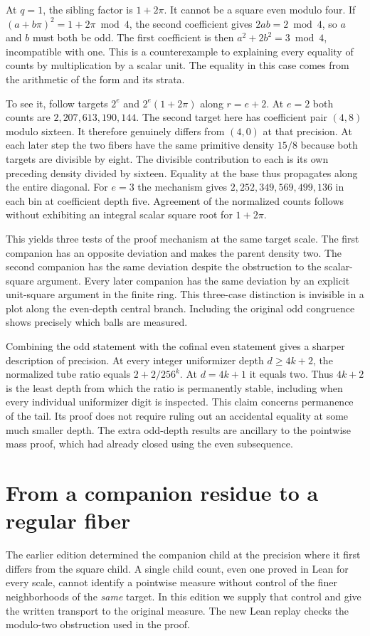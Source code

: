 \documentclass[12pt,letterpaper]{article}
\begin{document}
At $q=1$, the sibling factor is $1+2\pi$. It cannot be a square even modulo four. If $(a+b\pi)^2=1+2\pi\bmod4$, the second coefficient gives $2ab=2\bmod4$, so $a$ and $b$ must both be odd. The first coefficient is then $a^2+2b^2=3\bmod4$, incompatible with one. This is a counterexample to explaining every equality of counts by multiplication by a scalar unit. The equality in this case comes from the arithmetic of the form and its strata.

To see it, follow targets $2^e$ and $2^e(1+2\pi)$ along $r=e+2$. At $e=2$ both counts are $2{,}207{,}613{,}190{,}144$. The second target here has coefficient pair $(4,8)$ modulo sixteen. It therefore genuinely differs from $(4,0)$ at that precision. At each later step the two fibers have the same primitive density $15/8$ because both targets are divisible by eight. The divisible contribution to each is its own preceding density divided by sixteen. Equality at the base thus propagates along the entire diagonal. For $e=3$ the mechanism gives $2{,}252{,}349{,}569{,}499{,}136$ in each bin at coefficient depth five. Agreement of the normalized counts follows without exhibiting an integral scalar square root for $1+2\pi$.

This yields three tests of the proof mechanism at the same target scale. The first companion has an opposite deviation and makes the parent density two. The second companion has the same deviation despite the obstruction to the scalar-square argument. Every later companion has the same deviation by an explicit unit-square argument in the finite ring. This three-case distinction is invisible in a plot along the even-depth central branch. Including the original odd congruence shows precisely which balls are measured.

Combining the odd statement with the cofinal even statement gives a sharper description of precision. At every integer uniformizer depth $d\ge4k+2$, the normalized tube ratio equals $2+2/256^k$. At $d=4k+1$ it equals two. Thus $4k+2$ is the least depth from which the ratio is permanently stable, including when every individual uniformizer digit is inspected. This claim concerns permanence of the tail. Its proof does not require ruling out an accidental equality at some much smaller depth. The extra odd-depth results are ancillary to the pointwise mass proof, which had already closed using the even subsequence.

\section{From a companion residue to a regular fiber}
\label{sec:companion-fiber}
The earlier edition determined the companion child at the precision where it first differs from the square child. A single child count, even one proved in Lean for every scale, cannot identify a pointwise measure without control of the finer neighborhoods of the \emph{same} target. In this edition we supply that control and give the written transport to the original measure. The new Lean replay checks the modulo-two obstruction used in the proof.
\end{document}
